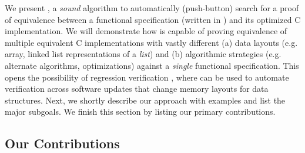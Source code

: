 We present \toolName{}, a {\em sound} algorithm to automatically (push-button) search
for a proof of equivalence between a functional specification (written in \SpecL{}) and its
optimized C implementation. We will demonstrate how \toolName{} is capable of
proving equivalence of multiple equivalent C implementations with vastly
different (a) data layouts (e.g. array, linked list representations of a {\em list})
and (b) algorithmic strategies (e.g. alternate algorithms, optimizations) against
a {\em single} functional specification.
This opens the possibility of regression verification \cite{strichman_regressverify,felsing14},
where \toolName{} can be used to automate verification across
software updates that change memory layouts for data structures.
Next, we shortly describe our approach with examples and list the major subgoals.
We finish this section by listing our primary contributions.

\subsection{Our Contributions}




% 

